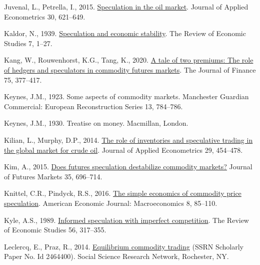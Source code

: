 \documentclass[]{elsarticle} %
\newlength{\cslhangindent}
\newlength{\cslentryspacingunit} %
\newenvironment{CSLReferences}[2] %
 {%
  \setlength{\parindent}{0pt}
  \ifodd #1
  \let\oldpar\par
  \def\par{\hangindent=\cslhangindent\oldpar}
  \fi
  \setlength{\parskip}{#2\cslentryspacingunit}
 }%
 {}
\begin{document}
\begin{CSLReferences}{1}{0}
\leavevmode{}%
Juvenal, L., Petrella, I., 2015. \href{https://doi.org/10.1002/jae.2388}{Speculation in the oil market}. Journal of Applied Econometrics 30, 621--649.

\leavevmode{}%
Kaldor, N., 1939. \href{https://doi.org/10.2307/2967593}{Speculation and economic stability}. The Review of Economic Studies 7, 1--27.

\leavevmode{}%
Kang, W., Rouwenhorst, K.G., Tang, K., 2020. \href{https://doi.org/10.1111/jofi.12845}{A tale of two premiums: The role of hedgers and speculators in commodity futures markets}. The Journal of Finance 75, 377--417.

\leavevmode{}%
Keynes, J.M., 1923. Some aspects of commodity markets. Manchester Guardian Commercial: European Reconstruction Series 13, 784--786.

\leavevmode{}%
Keynes, J.M., 1930. Treatise on money. Macmillan, London.

\leavevmode{}%
Kilian, L., Murphy, D.P., 2014. \href{https://doi.org/10.1002/jae.2322}{The role of inventories and speculative trading in the global market for crude oil}. Journal of Applied Econometrics 29, 454--478.

\leavevmode{}%
Kim, A., 2015. \href{https://doi.org/10.1002/fut.21716}{Does futures speculation destabilize commodity markets?} Journal of Futures Markets 35, 696--714.

\leavevmode{}%
Knittel, C.R., Pindyck, R.S., 2016. \href{https://doi.org/10.1257/mac.20140033}{The simple economics of commodity price speculation}. American Economic Journal: Macroeconomics 8, 85--110.

\leavevmode{}%
Kyle, A.S., 1989. \href{https://doi.org/10.2307/2297551}{Informed speculation with imperfect competition}. The Review of Economic Studies 56, 317--355.

\leavevmode{}%
Leclercq, E., Praz, R., 2014. \href{https://doi.org/10.2139/ssrn.2464400}{Equilibrium commodity trading} (SSRN Scholarly Paper No. Id 2464400). Social Science Research Network, Rochester, NY.


\end{CSLReferences}
\end{document}

